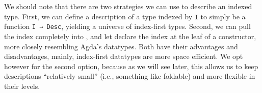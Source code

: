 We should note that there are two strategies we can use to describe an indexed type. First, we can define a description of a type indexed by \texttt{I} to simply be a function \texttt{I → Desc}, yielding a universe of index-first types. Second, we can pull the index completely into , and let  declare the index at the leaf of a constructor, more closely resembling Agda's datatypes. Both have their advantages and disadvantages, mainly, index-first datatypes are more space efficient. We opt however for the second option, because as we will see later, this allows us to keep descriptions ``relatively small'' (i.e., something like foldable) and more flexible in their levels.
\begin{code}[hide]%
\>[0]\AgdaSpace{}%
\AgdaSpace{}%
\<%
\\
\>[0][@{}l@{\AgdaIndent{0}}]%
\>[2]\AgdaSpace{}%
\<%
\\
\>[2][@{}l@{\AgdaIndent{0}}]%
\>[4]\AgdaSpace{}%
\AgdaSymbol{:}\AgdaSpace{}%
\<%
\end{code}
\begin{code}%
%
\>[2]\AgdaSpace{}%
\AgdaSpace{}%
\AgdaSymbol{(}\AgdaSpace{}%
\AgdaSymbol{:}\AgdaSpace{}%
\AgdaSymbol{)}\AgdaSpace{}%
\AgdaSymbol{:}\AgdaSpace{}%
\AgdaSpace{}%
\<%
\\
\>[2][@{}l@{\AgdaIndent{0}}]%
\>[4]%
\>[9]\AgdaSymbol{:}\AgdaSpace{}%
\AgdaSpace{}%
\AgdaSpace{}%
\AgdaSpace{}%
\<%
\\
%
\>[4]%
\>[9]\AgdaSymbol{:}\AgdaSpace{}%
\AgdaSpace{}%
\AgdaSpace{}%
\AgdaSpace{}%
\AgdaSpace{}%
\AgdaSpace{}%
\AgdaSpace{}%
\<%
\\
%
\>[4]%
\>[9]\AgdaSymbol{:}\AgdaSpace{}%
\AgdaSymbol{(}\AgdaSpace{}%
\AgdaSymbol{:}\AgdaSpace{}%
\AgdaSymbol{)}\AgdaSpace{}%
\AgdaSpace{}%
\AgdaSymbol{(}\AgdaSpace{}%
\AgdaSpace{}%
\AgdaSpace{}%
\AgdaSymbol{)}\AgdaSpace{}%
\AgdaSpace{}%
\AgdaSpace{}%
\<%
\\
%
\>[4]%
\>[9]\AgdaSymbol{:}\AgdaSpace{}%
\AgdaSpace{}%
\AgdaSpace{}%
\AgdaSpace{}%
\AgdaSpace{}%
\AgdaSpace{}%
\AgdaSpace{}%
\AgdaSpace{}%
\<%
\end{code}
